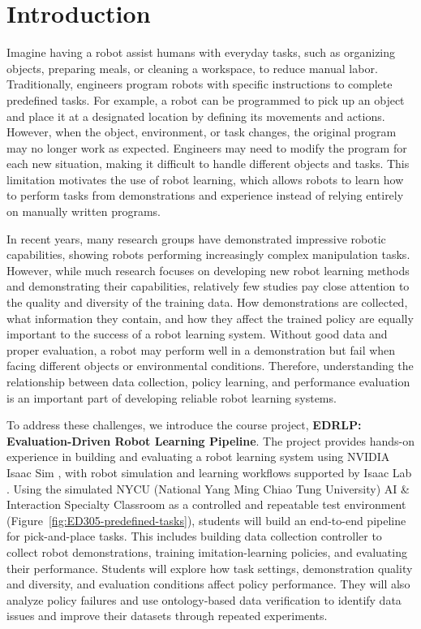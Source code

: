 \documentclass[11pt]{article}
\begin{document}
\section{Introduction}

Imagine having a robot assist humans with everyday tasks, such as organizing objects, preparing meals, or cleaning a workspace, to reduce manual labor. Traditionally, engineers program robots with specific instructions to complete predefined tasks. For example, a robot can be programmed to pick up an object and place it at a designated location by defining its movements and actions. However, when the object, environment, or task changes, the original program may no longer work as expected. Engineers may need to modify the program for each new situation, making it difficult to handle different objects and tasks. This limitation motivates the use of robot learning, which allows robots to learn how to perform tasks from demonstrations and experience instead of relying entirely on manually written programs.

In recent years, many research groups have demonstrated impressive robotic capabilities, showing robots performing increasingly complex manipulation tasks. However, while much research focuses on developing new robot learning methods and demonstrating their capabilities, relatively few studies pay close attention to the quality and diversity of the training data. How demonstrations are collected, what information they contain, and how they affect the trained policy are equally important to the success of a robot learning system. Without good data and proper evaluation, a robot may perform well in a demonstration but fail when facing different objects or environmental conditions. Therefore, understanding the relationship between data collection, policy learning, and performance evaluation is an important part of developing reliable robot learning systems.

To address these challenges, we introduce the course project, \textbf{EDRLP: Evaluation-Driven Robot Learning Pipeline}. The project provides hands-on experience in building and evaluating a robot learning system using NVIDIA Isaac Sim \cite{isaacsim2026}, with robot simulation and learning workflows supported by Isaac Lab \cite{isaaclab}. Using the simulated NYCU (National Yang Ming Chiao Tung University) AI \& Interaction Specialty Classroom as a controlled and repeatable test environment (Figure~\ref{fig:ED305-predefined-tasks}), students will build an end-to-end pipeline for pick-and-place tasks. This includes building data collection controller to collect robot demonstrations, training imitation-learning policies, and evaluating their performance. Students will explore how task settings, demonstration quality and diversity, and evaluation conditions affect policy performance. They will also analyze policy failures and use ontology-based data verification to identify data issues and improve their datasets through repeated experiments.
\end{document}
